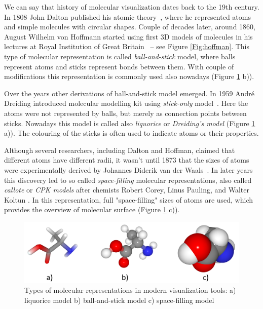 We can say that history of molecular visualization dates back to the 19th century. In 1808 John Dalton published his atomic theory~\cite{dalton1808new}, where he represented atoms and simple molecules with circular shapes. Couple of decades later, around 1860, August Wilhelm von Hoffmann started using first 3D models of molecules in his lectures at Royal Institution of Great Britain~\cite{perkins2005history} -- see Figure \ref{Fig:hoffman}. This type of molecular representation is called \textit{ball-and-stick} model, where balls represent atoms and sticks represent bonds between them. With couple of modifications this representation is commonly used also nowadays (Figure \ref{Fig:vis} b)). 

Over the years other derivations of ball-and-stick model emerged. In 1959 André Dreiding introduced molecular modelling kit using \textit{stick-only} model~\cite{dreiding1959einfache}. Here the atoms were not represented by balls, but merely as connection points between sticks. Nowadays this model is called also \textit{liquorice} or \textit{Dreiding's model} (Figure \ref{Fig:vis} a)). The colouring of the sticks is often used to indicate atoms or their properties.

Although several researchers, including Dalton and Hoffman, claimed that different atoms have different radii, it wasn't until 1873 that the sizes of atoms were experimentally derived by Johannes Diderik van der Waals~\cite{Waals1873PhDThesis}. In later years this discovery led to so called \textit{space-filling} molecular representations, also called \textit{callote} or \textit{CPK models} after chemists Robert Corey, Linus Pauling, and Walter Koltun \cite{corey1953molecular}. In this representation, full "space-filling" sizes of atoms are used, which provides the overview of molecular surface (Figure \ref{Fig:vis} c)).

\begin{figure}[H]
  \centering
  \includegraphics[width=\linewidth]{pictures/vis.pdf} 
  \caption{Types of molecular representations in modern visualization tools: a) liquorice model b) ball-and-stick model c) space-filling model}
  \label{Fig:vis}  
\end{figure} 

